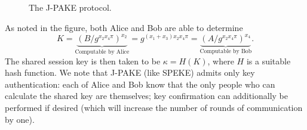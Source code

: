 \begin{figure}[h]
    \caption{The J-PAKE protocol.}
    \label{fig:JPAKE}
\end{figure}

 As noted in the figure, both Alice and Bob are able to determine 
 \[ K = \underbrace{\left(B / g^{x_2x_4 \pi} \right)^{x_2}}_\text{Computable by Alice} = g^{(x_1+x_3)x_2x_4\pi} = 
 \underbrace{\left(A / g^{x_2x_4 \pi} \right)^{x_4}}_\text{Computable by Bob}. \]
 The shared session key is then taken to be $\kappa = H(K)$, where $H$ is a suitable hash function. 
 We note that J-PAKE (like SPEKE) admits only key authentication: each of Alice and 
 Bob know that the only people who can calculate the shared key are themselves; key confirmation can additionally be 
 performed if desired (which will increase the number of rounds of communication by one).
 \\


